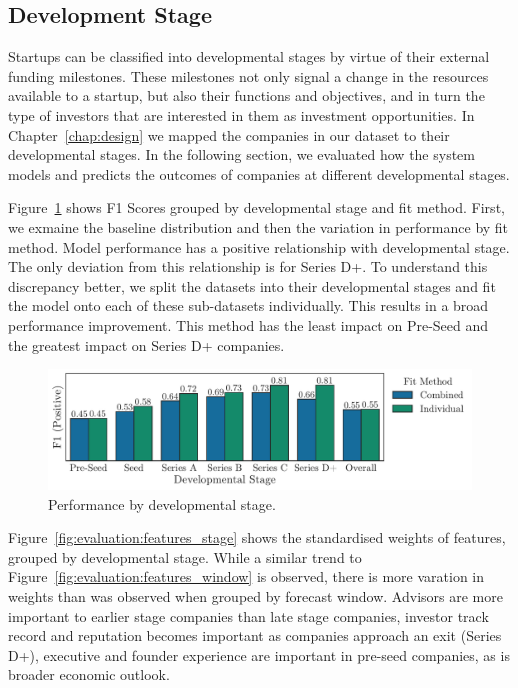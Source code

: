 \documentclass[../thesis/thesis.tex]{subfiles}
\begin{document}
\subsection{Development Stage}

Startups can be classified into developmental stages by virtue of their external funding milestones. These milestones not only signal a change in the resources available to a startup, but also their functions and objectives, and in turn the type of investors that are interested in them as investment opportunities. In Chapter~\ref{chap:design} we mapped the companies in our dataset to their developmental stages. In the following section, we evaluated how the system models and predicts the outcomes of companies at different developmental stages.

Figure~\ref{fig:evaluation:performance_stage} shows F1 Scores grouped by developmental stage and fit method. First, we exmaine the baseline distribution and then the variation in performance by fit method. Model performance has a positive relationship with developmental stage. The only deviation from this relationship is for Series D+. To understand this discrepancy better, we split the datasets into their developmental stages and fit the model onto each of these sub-datasets individually. This results in a broad performance improvement. This method has the least impact on Pre-Seed and the greatest impact on Series D+ companies.

\begin{figure}[!htb]
    \centering
    \includegraphics[width=\textwidth]{../figures/evaluation/performance_stage}
    \caption[Performance by developmental stage]{Performance by developmental stage.}
    \label{fig:evaluation:performance_stage}
\end{figure}

Figure~\ref{fig:evaluation:features_stage} shows the standardised weights of features, grouped by developmental stage. While a similar trend to Figure~\ref{fig:evaluation:features_window} is observed, there is more varation in weights than was observed when grouped by forecast window. Advisors are more important to earlier stage companies than late stage companies, investor track record and reputation becomes important as companies approach an exit (Series D+), executive and founder experience are important in pre-seed companies, as is broader economic outlook.
\end{document}
